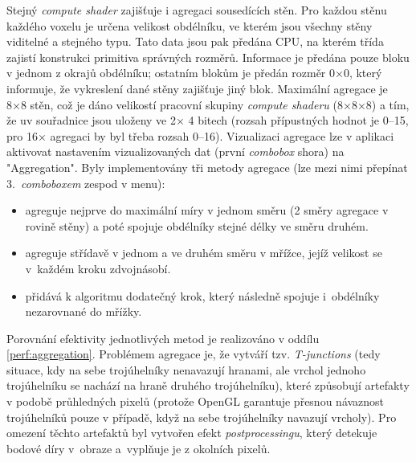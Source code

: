 Stejný \textit{compute shader} zajišťuje i agregaci sousedících stěn. Pro každou stěnu každého voxelu je určena velikost obdélníku, ve kterém jsou všechny stěny viditelné a stejného typu. Tato data jsou pak předána CPU, na kterém třída  zajistí konstrukci primitiva správných rozměrů. Informace je předána pouze bloku v jednom z okrajů obdélníku; ostatním blokům je předán rozměr 0×0, který  informuje, že vykreslení dané stěny zajišťuje jiný blok. Maximální agregace je 8×8 stěn, což je dáno velikostí pracovní skupiny \textit{compute shaderu} (8×8×8) a tím, že uv souřadnice jsou uloženy ve 2× 4 bitech (rozsah přípustných hodnot je 0–15, pro 16× agregaci by byl třeba rozsah 0–16). Vizualizaci agregace lze v aplikaci aktivovat nastavením vizualizovaných dat (první \textit{combobox} shora) na "Aggregation". Byly implementovány tři metody agregace (lze mezi nimi přepínat 3.~\textit{comboboxem} zespod v menu):
\begin{itemize}
	\item \textbf{} agreguje nejprve do maximální míry v jednom směru (2 směry agregace v rovině stěny) a poté spojuje obdélníky stejné délky ve směru druhém.
	\item \textbf{} agreguje střídavě v jednom a ve druhém směru v mřížce, jejíž velikost se v~každém kroku zdvojnásobí.
	\item \textbf{} přidává k algoritmu  dodatečný krok, který následně spojuje i~obdélníky nezarovnané do mřížky.
\end{itemize}

Porovnání efektivity jednotlivých metod je realizováno v oddílu \ref{perf:aggregation}. Problémem agregace je, že vytváří tzv. \textit{T-junctions} (tedy situace, kdy na sebe trojúhelníky nenavazují hranami, ale vrchol jednoho trojúhelníku se nachází na hraně druhého trojúhelníku), které způsobují artefakty v podobě průhledných pixelů (protože OpenGL garantuje přesnou návaznost trojúhelníků pouze v případě, když na sebe trojúhelníky navazují vrcholy). Pro omezení těchto artefaktů byl vytvořen efekt \textit{postprocessingu}, který detekuje bodové díry v~obraze a~vyplňuje je z okolních pixelů.

